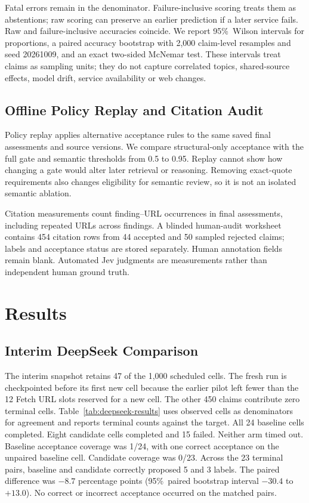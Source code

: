 \documentclass[conference]{IEEEtran}
\newcommand{\pct}{\%}
\begin{document}
Fatal errors remain in the denominator. Failure-inclusive scoring treats them as abstentions; raw scoring can preserve an earlier prediction if a later service fails. Raw and failure-inclusive accuracies coincide. We report 95\pct\ Wilson intervals for proportions, a paired accuracy bootstrap with 2,000 claim-level resamples and seed 20261009, and an exact two-sided McNemar test. These intervals treat claims as sampling units; they do not capture correlated topics, shared-source effects, model drift, service availability or web changes.

\subsection{Offline Policy Replay and Citation Audit}
Policy replay applies alternative acceptance rules to the same saved final assessments and source versions. We compare structural-only acceptance with the full gate and semantic thresholds from 0.5 to 0.95. Replay cannot show how changing a gate would alter later retrieval or reasoning. Removing exact-quote requirements also changes eligibility for semantic review, so it is not an isolated semantic ablation.

Citation measurements count finding--URL occurrences in final assessments, including repeated URLs across findings. A blinded human-audit worksheet contains 454 citation rows from 44 accepted and 50 sampled rejected claims; labels and acceptance status are stored separately. Human annotation fields remain blank. Automated Jev judgments are measurements rather than independent human ground truth.

\section{Results}
\subsection{Interim DeepSeek Comparison}
The interim snapshot retains 47 of the 1,000 scheduled cells. The fresh run is checkpointed before its first new cell because the earlier pilot left fewer than the 12 Fetch URL slots reserved for a new cell. The other 450 claims contribute zero terminal cells. Table~\ref{tab:deepseek-results} uses observed cells as denominators for agreement and reports terminal counts against the target. All 24 baseline cells completed. Eight candidate cells completed and 15 failed. Neither arm timed out. Baseline acceptance coverage was 1/24, with one correct acceptance on the unpaired baseline cell. Candidate coverage was 0/23. Across the 23 terminal pairs, baseline and candidate correctly proposed 5 and 3 labels. The paired difference was $-8.7$ percentage points (95\pct\ paired bootstrap interval $-30.4$ to $+13.0$). No correct or incorrect acceptance occurred on the matched pairs.
\end{document}
